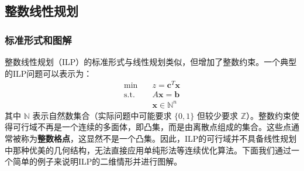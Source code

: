 \documentclass[12pt]{article}
\theoremstyle{plain}
\theoremstyle{definition}
\newcommand{\N}{\mathbb{N}}
\newcommand{\Z}{\mathbb{Z}}
\newcommand{\st}{\mathrel{\text{s.t.}}}
\begin{document}
\subsection{整数线性规划}\label{subsec:ilp}

\subsubsection{标准形式和图解}\label{subsubsec:ilp_standard_form}

整数线性规划（ILP）的标准形式与线性规划类似，但增加了整数约束。一个典型的ILP问题可以表示为：
\begin{align*}
    \min \quad & z = \bm{c}^T \bm{x} \\
    \st \quad & A\bm{x} = \bm{b} \\
    & \bm{x} \in \N^n
\end{align*}
其中 $\N$ 表示自然数集合（实际问题中可能要求 $\{0, 1\}$ 但较少要求 $\Z$）。整数约束使得可行域不再是一个连续的多面体，即凸集，而是由离散点组成的集合。这些点通常被称为\textbf{整数格点}，这显然不是一个凸集。因此，ILP的可行域并不具备线性规划中那种优美的几何结构，无法直接应用单纯形法等连续优化算法。下面我们通过一个简单的例子来说明ILP的二维情形并进行图解。
\end{document}

